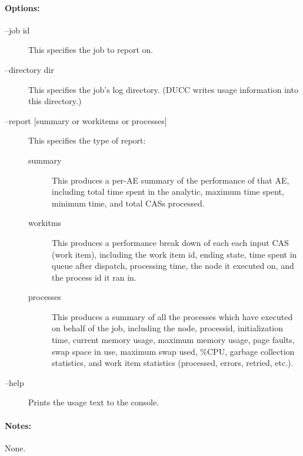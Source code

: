     \paragraph{Options:}
    \begin{description}
        \item[--job id] This specifies the job to report on.
        \item[--directory dir] This specifies the job's log directory. (DUCC writes usage information into this
          directory.)
        \item[--report {[summary or workitems or processes]}]
          This specifies the type of report:
          \begin{description}
              \item[summary] This produces a per-AE summary of the performance of that AE, including
                total time spent in the analytic, maximum time spent, minimum time, and total CASs
                processed.
              \item[workitms] This produces a performance break down of each each input CAS (work
                item), including the work item id, ending state, time spent in queue after dispatch,
                processing time, the node it executed on, and the process id it ran in.
              \item[processes] This produces a summary of all the processes which have executed on
                behalf of the job, including the node, processid, initialization time, current memory usage,
                maximum memory usage, page faults, swap space in use, maximum swap used, \%CPU,
                garbage collection statistics, and work item statistics (processed, errors, retried, etc.).
          \end{description}
        \item[--help] Prints the usage text to the console. 
     \end{description}
        
    \paragraph{Notes:}
    None.

